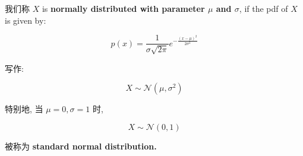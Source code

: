 \begin{definition}

我们称 \(\mathit{X}\) is \textbf{normally distributed with parameter \(\mathit{\mu}\) and \(\mathit{\sigma}\)}, if the pdf of \(\mathit{X}\) is given by:

\[\mathit{p}(\mathit{x}) = \frac{1}{\mathit{\sigma}\sqrt{2\mathit{\pi}}}\mathit{e}^{- \frac{(\mathit{x} - \mathit{\mu})^{2}}{2\mathit{\sigma}^{2}}}\]

写作:

\[\mathit{X} \sim \mathcal{N}(\mathit{\mu},\mathit{\sigma}^{2})\]

特别地, 当 \(\mathit{\mu} = 0,\mathit{\sigma} = 1\) 时,

\[\mathit{X} \sim \mathcal{N}(0,1)\]

被称为 \textbf{standard normal distribution.}

\end{definition}

